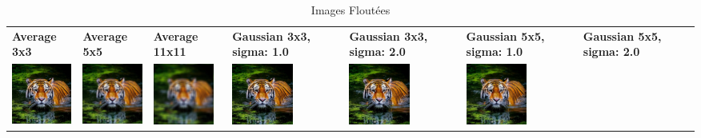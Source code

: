 \begin{table}[h!]
    \centering
    \captionsetup{justification=centering}
    \caption*{Images Floutées}
    \begin{tabular}{>{\centering\arraybackslash} m{2cm} >{\centering\arraybackslash} m{2cm} >{\centering\arraybackslash} m{2cm} >{\centering\arraybackslash} m{2cm} >{\centering\arraybackslash} m{2cm} >{\centering\arraybackslash} m{2cm} >{\centering\arraybackslash} m{2cm}}
        \textbf{Average 3x3}                                                                  & \textbf{Average 5x5} & \textbf{Average 11x11} & \textbf{Gaussian 3x3, sigma: 1.0} & \textbf{Gaussian 3x3, sigma: 2.0} & \textbf{Gaussian 5x5, sigma: 1.0} & \textbf{Gaussian 5x5, sigma: 2.0} \\
        \includegraphics[width=2cm]{images/processed/tiger/average_3x3/blurred.png}           &
        \includegraphics[width=2cm]{images/processed/tiger/average_5x5/blurred.png}           &
        \includegraphics[width=2cm]{images/processed/tiger/average_11x11/blurred.png}         &
        \includegraphics[width=2cm]{images/processed/tiger/gaussian_3x3_sigma1.0/blurred.png} &
        \includegraphics[width=2cm]{images/processed/tiger/gaussian_3x3_sigma2.0/blurred.png} &
        \includegraphics[width=2cm]{images/processed/tiger/gaussian_5x5_sigma1.0/blurred.png} &

\end{tabular}
\end{table}
